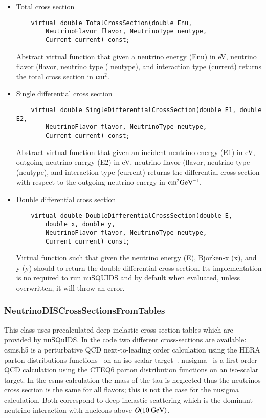 \begin{itemize}
  \item Total cross section
  \begin{lstlisting}
    virtual double TotalCrossSection(double Enu,
    	NeutrinoFlavor flavor, NeutrinoType neutype,
    	Current current) const;
  \end{lstlisting}
  Abstract virtual function that given a neutrino energy ({\ttf Enu})
  in eV, neutrino flavor ({\ttf flavor}, neutrino type ({\ttf
    neutype}), and interaction type ({\ttf current}) returns the 
  total cross section in ${\rm cm}^2$.
  \item Single differential cross section
  \begin{lstlisting}
    virtual double SingleDifferentialCrossSection(double E1, double E2,
    	NeutrinoFlavor flavor, NeutrinoType neutype,
    	Current current) const;
  \end{lstlisting}
  Abstract virtual function that given an incident neutrino energy
  ({\ttf E1}) in eV, outgoing neutrino energy ({\ttf E2}) in eV,
  neutrino flavor ({\ttf flavor}, neutrino type ({\ttf neutype}), and
  interaction type ({\ttf current}) returns the differential cross
  section with respect to the outgoing neutrino energy in ${\rm
    cm}^2{\rm GeV}^{-1}$.  
  \item Double differential cross section
  \begin{lstlisting}
    virtual double DoubleDifferentialCrossSection(double E, 
        double x, double y,
    	NeutrinoFlavor flavor, NeutrinoType neutype,
    	Current current) const;
  \end{lstlisting}
  Virtual function such that given the neutrino energy ({\ttf E}),
  Bjorken-x ({\ttf x}), and y ({\ttf y}) should to return the double
   differential cross section. Its implementation is no required to
   run {\ttf nuSQUIDS} and by default when evaluated, unless
   overwritten, it will throw an error. 
\end{itemize}

\subsubsection{NeutrinoDISCrossSectionsFromTables}

This class uses precalculated deep inelastic cross section tables
which are provided by {\ttf nuSQuIDS}.
In the code two different cross-sections are available:
{\ttf csms.h5} is a perturbative QCD next-to-leading order calculation using the HERA
parton distributions functions~\cite{Chekanov:2002pv} on an iso-scalar
target~\cite{CooperSarkar:2011pa}. {\ttf nusigma}~\cite{nusigma} is a first order QCD
calculation using the {\ttf CTEQ6} parton distribution functions on an
iso-scalar target. In the {\ttf csms} calculation the mass of the tau
is neglected thus the neutrinos cross section is the same for all
flavors; this is not the case for the {\ttf nusigma} calculation.
Both correspond to deep inelastic scattering which is the dominant
neutrino interaction with nucleons above $O({\rm 10~GeV})$. 

